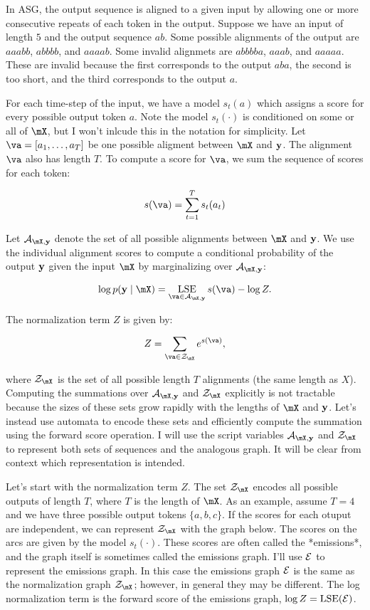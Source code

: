 In ASG, the output sequence is aligned to a given input by allowing one or more
consecutive repeats of each token in the output. Suppose we have an input of
length $5$ and the output sequence $ab$. Some possible alignments of the output
are $aaabb$, $abbbb$, and $aaaab$. Some invalid alignmets are $abbbba$, $aaab$,
and $aaaaa$. These are invalid because the first corresponds to the output
$aba$, the second is too short, and the third corresponds to the output $a$.

For each time-step of the input, we have a model $s_t(a)$ which assigns a score
for every possible output token $a$. Note the model $s_t(\cdot)$ is conditioned
on some or all of $\mX$, but I won't inlcude this in the notation for
simplicity. Let $\va = [a_1, \ldots, a_T]$ be one possible aligment between
$\mX$ and ${\bf y}$. The alignment $\va$ also has length $T$. To compute a score
for $\va$, we sum the sequence of scores for each token:

$$
s(\va) = \sum_{t=1}^T s_t(a_t)
$$

Let $\gA_{\mX,\vy}$ denote the set of all possible alignments between $\mX$ and
${\bf y}$. We use the individual alignment scores to compute a conditional
probability of the output ${\bf y}$ given the input $\mX$ by marginalizing over
$\gA_{\mX,\vy}$:

$$
\log p(\vy \mid \mX) = \LSE_{\va \in \gA_{\mX, \vy}} s(\va) - \log Z.
$$

The normalization term $Z$ is given by:

$$
Z = \sum_{\va \in \gZ_\mX} e^{s(\va)},
$$

where $\gZ_\mX$ is the set of all possible length $T$ alignments (the same
length as $X$). Computing the summations over $\gA_{\mX,\vy}$ and $\gZ_\mX$
explicitly is not tractable because the sizes of these sets grow rapidly with
the lengths of $\mX$ and ${\bf y}$. Let's instead use automata to encode these sets
and efficiently compute the summation using the forward score operation. I will
use the script variables $\gA_{\mX,\vy}$ and $\gZ_\mX$ to represent both sets
of sequences and the analogous graph. It will be clear from context which
representation is intended.

Let's start with the normalization term $Z$. The set $\gZ_\mX$ encodes all
possible outputs of length $T$, where $T$ is the length of $\mX$. As an
example, assume $T=4$ and we have three possible output tokens $\{a, b, c\}$.
If the scores for each otuput are independent, we can represent $\gZ_\mX$ with
the graph below. The scores on the arcs are given by the model $s_t(\cdot)$.
These scores are often called the *emissions*, and the graph itself is
sometimes called the emissions graph. I'll use $\mathcal{E}$ to represent the emissions
graph. In this case the emissions graph $\mathcal{E}$ is the same as the normalization
graph $\gZ_\mX$; however, in general they may be different. The log
normalization term is the forward score of the emissions graph, $\log Z =
\operatorname*{\textrm{LSE}}(\mathcal{E})$.

